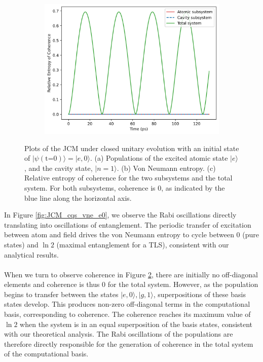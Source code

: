 \documentclass[11pt]{article}
\begin{document}
\begin{figure}[H]
    \begin{subfigure}{0.45\textwidth}
        \centering
        \includegraphics[width=\linewidth]{Research Project/Code/results/JCM/CQS_coh.png}
        \caption{}
        \label{fig:JCM_cqs_coh_e0}
    \end{subfigure}
    \hfill
    \caption{Plots of the JCM under closed unitary evolution with an initial state of $|\psi (\text{t=0})\rangle = |e, 0\rangle$. (a) Populations of the excited atomic state $|e\rangle$, and the cavity state, $|n=1\rangle$. (b) Von Neumann entropy. (c) Relative entropy of coherence for the two subsystems and the total system. For both subsystems, coherence is 0, as indicated by the blue line along the horizontal axis.}
\end{figure}

\noindent In Figure \ref{fig:JCM_cqs_vne_e0}, we observe the Rabi oscillations directly translating into oscillations of entanglement. The periodic transfer of excitation between atom and field drives the von Neumann entropy to cycle between 0 (pure states) and $\ln 2$ (maximal entanglement for a TLS), consistent with our analytical results.\\
\\
When we turn to observe coherence in Figure \ref{fig:JCM_cqs_coh_e0}, there are initially no off-diagonal elements and coherence is thus 0 for the total system. However, as the population begins to transfer between the states $|e,0\rangle,|g,1\rangle$, superpositions of these basis states develop. This produces non-zero off-diagonal terms in the computational basis, corresponding to coherence. The coherence reaches its maximum value of $\ln2$ when the system is in an equal superposition of the basis states, consistent with our theoretical analysis. The Rabi oscillations of the populations are therefore directly responsible for the generation of coherence in the total system of the computational basis. 
\end{document}
